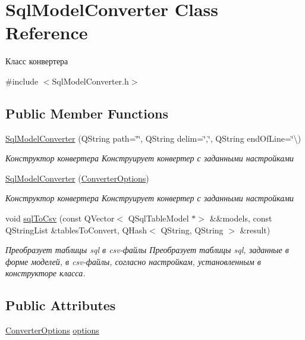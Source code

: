 \hypertarget{class_sql_model_converter}{}\section{Sql\+Model\+Converter Class Reference}
\label{class_sql_model_converter}


Класс конвертера  




{\ttfamily \#include $<$Sql\+Model\+Converter.\+h$>$}

\subsection*{Public Member Functions}
\begin{DoxyCompactItemize}
\item 
\hyperlink{class_sql_model_converter_af7cf0d9772323b9707697f0ab4fc4e77}{Sql\+Model\+Converter} (Q\+String path=\char`\"{}\char`\"{}, Q\+String delim=\char`\"{},\char`\"{}, Q\+String end\+Of\+Line=\char`\"{}\textbackslash{})
\begin{DoxyCompactList}\small\item\em Конструктор конвертера Конструирует конвертер с заданными настройками \end{DoxyCompactList}\item 
\hyperlink{class_sql_model_converter_a9d2feafdb9c7568370f2c02bb7e5e64f}{Sql\+Model\+Converter} (\hyperlink{class_converter_options}{Converter\+Options})
\begin{DoxyCompactList}\small\item\em Конструктор конвертера Конструирует конвертер с заданными настройками \end{DoxyCompactList}\item 
void \hyperlink{class_sql_model_converter_a0c4361920533685590697c2bd689157b}{sql\+To\+Csv} (const Q\+Vector$<$ Q\+Sql\+Table\+Model $\ast$$>$ \&\&models, const Q\+String\+List \&tables\+To\+Convert, Q\+Hash$<$ Q\+String, Q\+String $>$ \&result)
\begin{DoxyCompactList}\small\item\em Преобразует таблицы sql в csv-\/файлы Преобразует таблицы sql, заданные в форме моделей, в csv-\/файлы, согласно настройкам, установленным в конструкторе класса. \end{DoxyCompactList}\end{DoxyCompactItemize}
\subsection*{Public Attributes}
\begin{DoxyCompactItemize}
\item 
\hyperlink{class_converter_options}{Converter\+Options} \hyperlink{class_sql_model_converter_a562f55118cd1924c249796b6e183acbd}{options}
\end{DoxyCompactItemize}



